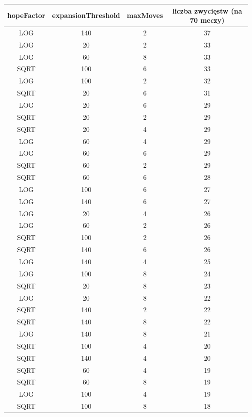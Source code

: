 \documentclass{pracamgr}
\begin{document}
\begin{appendices}
\begin{center}
    \begin{tabular}{| c | c | c | c |}
	\hline
    hopeFactor & expansionThreshold & maxMoves & liczba zwycięstw (na 70 meczy) \\ \hline
	\hline
        LOG & 140 & 2 & 37 \\ \hline
        LOG & 20 & 2 & 33 \\ \hline
        LOG & 60 & 8 & 33 \\ \hline
        SQRT & 100 & 6 & 33 \\ \hline
        LOG & 100 & 2 & 32 \\ \hline
        SQRT & 20 & 6 & 31 \\ \hline
        LOG & 20 & 6 & 29 \\ \hline
        SQRT & 20 & 2 & 29 \\ \hline
        SQRT & 20 & 4 & 29 \\ \hline
        LOG & 60 & 4 & 29 \\ \hline
        LOG & 60 & 6 & 29 \\ \hline
        SQRT & 60 & 2 & 29 \\ \hline
        SQRT & 60 & 6 & 28 \\ \hline
        LOG & 100 & 6 & 27 \\ \hline
        LOG & 140 & 6 & 27 \\ \hline
        LOG & 20 & 4 & 26 \\ \hline
        LOG & 60 & 2 & 26 \\ \hline
        SQRT & 100 & 2 & 26 \\ \hline
        SQRT & 140 & 6 & 26 \\ \hline
        LOG & 140 & 4 & 25 \\ \hline
        LOG & 100 & 8 & 24 \\ \hline
        SQRT & 20 & 8 & 23 \\ \hline
        LOG & 20 & 8 & 22 \\ \hline
        SQRT & 140 & 2 & 22 \\ \hline
        SQRT & 140 & 8 & 22 \\ \hline
        LOG & 140 & 8 & 21 \\ \hline
        SQRT & 100 & 4 & 20 \\ \hline
        SQRT & 140 & 4 & 20 \\ \hline
        SQRT & 60 & 4 & 19 \\ \hline
        SQRT & 60 & 8 & 19 \\ \hline
        LOG & 100 & 4 & 19 \\ \hline
        SQRT & 100 & 8 & 18 \\ \hline


\end{tabular}
\end{center}
\end{appendices}
\end{document}
